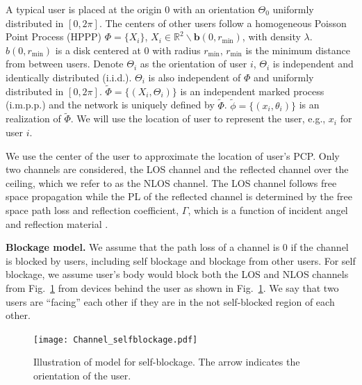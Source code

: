 \documentclass[10pt, conference, letterpaper]{IEEEtran}
\begin{document}
A typical user is placed at the origin 0 with an orientation $\Theta_0$ uniformly distributed in $[0, 2\pi]$. The centers of other users follow a homogeneous Poisson Point Process (HPPP) $\Phi = \{X_i\}$, $X_i\in\mathbb{R}^2\backslash\mathbf{b}(0, r_{\min})$, with density $\lambda$. $b(0, r_{\min})$ is a disk centered at $0$ with radius $r_{\min}$, $r_{\min}$ is the minimum distance from between users.  
Denote $\Theta_i$ as the orientation of user $i$, $\Theta_i$ is independent and identically distributed (i.i.d.).
$\Theta_i$ is also independent of $\Phi$ and uniformly distributed in $[0, 2\pi]$.
$\tilde{\Phi} = \{(X_i, \Theta_i)\}$ is an independent marked process (i.m.p.p.) and the network is uniquely defined by $\tilde{\Phi}$.
$\tilde{\phi} = \{(x_i, \theta_i)\}$ is an realization of $\tilde{\Phi}$. 
We will use the location of user to represent the user, e.g., $x_i$ for user $i$. 


We use the center of the user to approximate the location of user's PCP.
Only two channels are considered, the LOS channel and the reflected channel over the ceiling, which we refer to as the NLOS channel.
The LOS channel follows free space propagation while the PL of the reflected channel is determined by the free space path loss and reflection coefficient, $\Gamma$, which is a function of incident angel and reflection material \cite{reflection}.


\textbf{Blockage model.} We assume that the path loss of a channel is 0 if the channel is blocked by users, including self blockage and blockage from other users.
For self blockage, we assume user's body would block both the LOS and NLOS channels from Fig.~\ref{fig:channel:self-blockage} from devices behind the user as shown in Fig.~\ref{fig:channel:self-blockage}. 
We say that two users are ``facing'' each other if they are in the not self-blocked region of each other.


\begin{figure}
	\centering
	\texttt{[image: Channel\_selfblockage.pdf]}
	\caption{Illustration of model for self-blockage. The arrow indicates the orientation of the user.}
	\label{fig:channel:self-blockage}
\end{figure}
\end{document}
